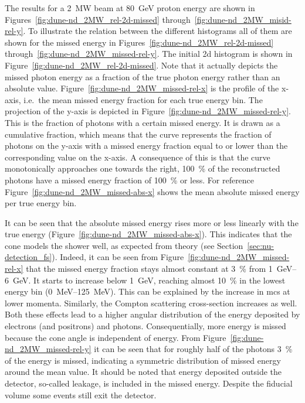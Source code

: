 The results for a \SI{2}{\mega\watt} beam at \SI{80}{\giga\electronvolt} proton energy are shown in Figures~\ref{fig:dune-nd_2MW_rel-2d-missed} through~\ref{fig:dune-nd_2MW_misid-rel-y}.
To illustrate the relation between the different histograms all of them are shown for the missed energy in Figures~\ref{fig:dune-nd_2MW_rel-2d-missed} through~\ref{fig:dune-nd_2MW_missed-rel-y}.
The initial \gls{2d} histogram is shown in Figure~\ref{fig:dune-nd_2MW_rel-2d-missed}.
Note that it actually depicts the missed photon energy as a fraction of the true photon energy rather than an absolute value.
Figure~\ref{fig:dune-nd_2MW_missed-rel-x} is the profile of the x-axis, i.e.\ the mean missed energy fraction for each true energy bin.
The projection of the y-axis is depicted in Figure~\ref{fig:dune-nd_2MW_missed-rel-y}.
This is the fraction of photons with a certain missed energy.
It is drawn as a cumulative fraction, which means that the curve represents the fraction of photons on the y-axis with a missed energy fraction equal to or lower than the corresponding value on the x-axis.
A consequence of this is that the curve monotonically approaches one towards the right, \SI{100}{\percent} of the reconstructed photons have a missed energy fraction of \SI{100}{\percent} or less.
For reference Figure~\ref{fig:dune-nd_2MW_missed-abs-x} shows the mean absolute missed energy per true energy bin.

It can be seen that the absolute missed energy rises more or less linearly with the true energy (Figure~\ref{fig:dune-nd_2MW_missed-abs-x}).
This indicates that the cone models the shower well, as expected from theory (see Section~\ref{sec:nu-detection_fs}).
Indeed, it can be seen from Figure~\ref{fig:dune-nd_2MW_missed-rel-x} that the missed energy fraction stays almost constant at \SI{3}{\percent} from \SIrange{1}{6}{\giga\electronvolt}.
It starts to increase below \SI{1}{\giga\electronvolt}, reaching almost \SI{10}{\percent} in the lowest energy bin (\SIrange{0}{125}{\mega\electronvolt}).
This can be explained by the increase in \gls{mcs} at lower momenta.
Similarly, the Compton scattering cross-section increases as well.
Both these effects lead to a higher angular distribution of the energy deposited by electrons (and positrons) and photons.
Consequentially, more energy is missed because the cone angle is independent of energy.
From Figure~\ref{fig:dune-nd_2MW_missed-rel-y} it can be seen that for roughly half of the photons \SI{3}{\percent} of the energy is missed, indicating a symmetric distribution of missed energy around the mean value.
It should be noted that energy deposited outside the detector, so-called leakage, is included in the missed energy.
Despite the fiducial volume some events still exit the detector.

